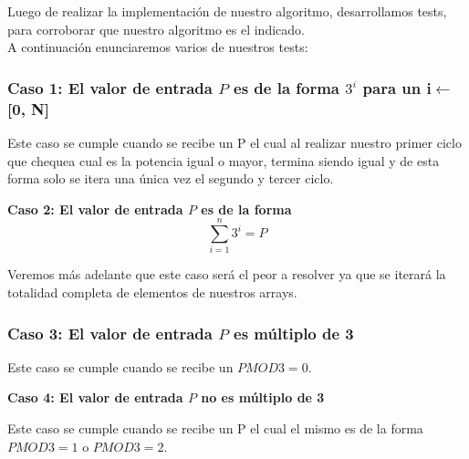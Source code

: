 \indent Luego de realizar la implementaci\'on de nuestro algoritmo, desarrollamos tests,
para corroborar que nuestro algoritmo es el indicado.\\

A continuaci\'on enunciaremos varios de nuestros tests:\\

\begin{center}
  \subsubsection*{Caso 1: El valor de entrada $P$ es de la forma ${3^i}$ para un i$\gets$[0, N] }
\end{center}
 Este caso se cumple cuando se recibe un P el cual al realizar nuestro primer ciclo que chequea cual es la potencia igual o mayor, termina siendo igual y de esta forma solo se itera una \'unica vez el segundo y tercer ciclo.
 
\begin{center}
\textbf{  Caso 2: El valor de entrada $P$ es de la forma\[
\sum_{i=1}^{n}3^{i}=P 
\]}
\end{center}

Veremos m\'as adelante que este caso ser\'a el peor a resolver ya que se iterar\'a la totalidad completa de elementos de nuestros arrays.

\begin{center}
 \subsubsection*{Caso 3: El valor de entrada $P$ es m\'ultiplo de 3}
\end{center}

 Este caso se cumple cuando se recibe un $P MOD 3 = 0$.

\begin{center}
\textbf{ Caso 4: El valor de entrada $P$ no es m\'ultiplo de 3}
\end{center}

 Este caso se cumple cuando se recibe un P el cual el mismo es de la forma $P MOD 3 = 1$ o $P MOD 3 = 2$.
 